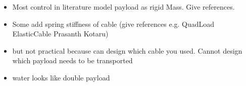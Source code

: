 {    \begin{itemize}
        \item Most control in literature model payload as rigid Mass. Give references.
        \item Some add spring stiffness of cable (give references e.g. QuadLoad ElasticCable Prasanth Kotaru)
        \item but not practical because can design which cable you used. Cannot design which payload needs to be transported
        \item water looks like double payload
    \end{itemize}

}

